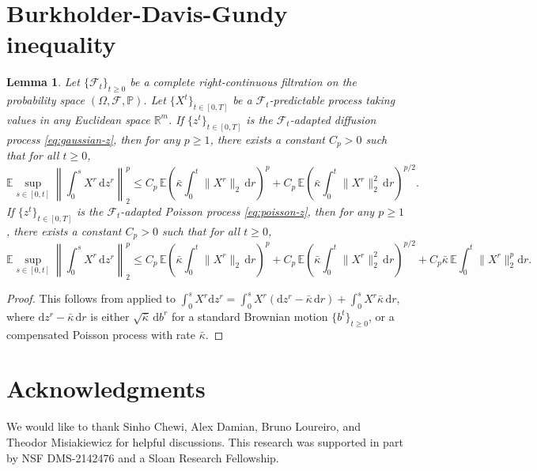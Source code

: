 \documentclass[11pt,letterpaper,reqno]{amsart}
\newtheorem{lem}[thm]{Lemma}
\theoremstyle{definition}
\def\d{\mathrm{d}}
\def\P{\mathbb{P}}
\def\E{\mathbb{E}}
\def\R{\mathbb{R}}
\def\cF{\mathcal{F}}
\begin{document}
\appendix

\section{Burkholder-Davis-Gundy inequality}

\begin{lem}\label{lem:burkholder}
Let $\{\mathcal{F}_t\}_{t \geq 0}$ be a complete right-continuous filtration on
the probability space $(\Omega,\cF,\P)$. Let
$\{X^t\}_{t \in [0,T]}$ be a $\cF_t$-predictable process taking
values in any Euclidean space $\R^m$. If $\{z^t\}_{t \in [0,T]}$
is the $\cF_t$-adapted diffusion process \eqref{eq:gaussian-z},
then for any $p \geq 1$,
there exists a constant $C_p>0$ such that for all $t \geq 0$,
\[\E \sup_{s \in [0,t]} \left\|\int_0^s X^r\,\d z^r\right\|_2^p \leq
C_p\,\E\left(\bar\kappa \int_0^t \|X^r\|_2\,\d r\right)^p
+C_p\,\E\left(\bar\kappa \int_0^t \|X^r\|_2^2\,\d r\right)^{p/2}.\]
If $\{z^t\}_{t \in [0,T]}$ is the $\cF_t$-adapted Poisson process 
\eqref{eq:poisson-z}, then for any $p \geq 1$,
there exists a constant $C_p>0$ such that for all $t \geq 0$,
\[\E \sup_{s \in [0,t]} \left\|\int_0^s X^r\,\d z^r\right\|_2^p \leq
C_p\,\E\left(\bar\kappa \int_0^t \|X^r\|_2\,\d r\right)^p
+C_p\,\E\left(\bar\kappa \int_0^t \|X^r\|_2^2\,\d r\right)^{p/2}
+C_p\bar\kappa\,\E\int_0^t \|X^r\|_2^p\d r.\]
\end{lem}
\begin{proof}
This follows from \cite[Thm 2.11]{kunita2004stochastic} applied to
$\int_0^s X^r \d z^r
=\int_0^s X^r (\d z^r-\bar \kappa\,\d r)+\int_0^s X^r \bar\kappa\,\d r$,
where $\d z^r-\bar \kappa\,\d r$ is either $\sqrt{\bar\kappa}\,\d b^r$ for a
standard Brownian motion $\{b^t\}_{t \geq 0}$, or a compensated Poisson 
process with rate $\bar\kappa$.
\end{proof}

\section*{Acknowledgments}

We would like to thank Sinho Chewi, Alex Damian, Bruno Loureiro, and Theodor Misiakiewicz for helpful discussions. This research was supported in part by NSF DMS-2142476 and a Sloan Research Fellowship.



\end{document}
